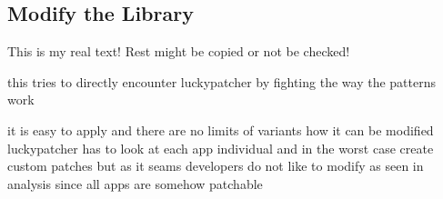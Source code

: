 \subsection{Modify the Library} \label{subsection:evaluation-modifications-library}
This is my real text! Rest might be copied or not be checked!

this tries to directly encounter luckypatcher by fighting the way the patterns work

it is easy to apply and there are no limits of variants how it can be modified
luckypatcher has to look at each app individual and in the worst case create custom patches
but as it seams developers do not like to modify as seen in analysis since all apps are somehow patchable
